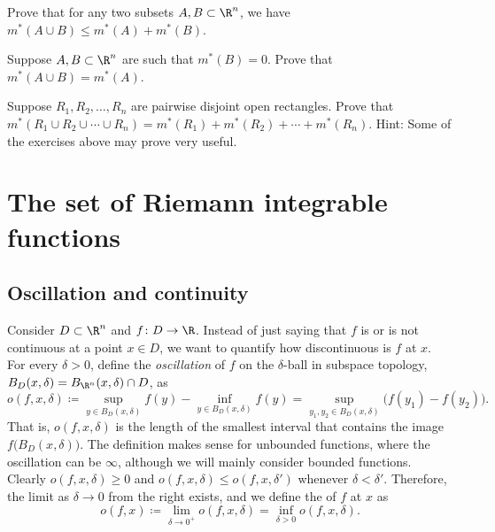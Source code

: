 \begin{exercise}
Prove that for any two subsets $A, B \subset \R^n$, we have
$m^*(A \cup B) \leq m^*(A)+m^*(B)$.
\end{exercise}

\begin{exercise}
Suppose $A, B \subset \R^n$ are such that $m^*(B)=0$.  Prove that
$m^*(A \cup B) = m^*(A)$.
\end{exercise}

\begin{exercise}[Challenging] \label{exercise:outermeasureofsumofrectangles}
Suppose $R_1,R_2,\ldots,R_n$ are pairwise disjoint open rectangles.
Prove that 
$m^*(R_1 \cup R_2 \cup \cdots \cup R_n) = m^*(R_1)+m^*(R_2)+\cdots+m^*(R_n)$.
Hint: Some of the exercises above may prove very useful.
\end{exercise}



\sectionnewpage
\section{The set of Riemann integrable functions }
\label{sec:riemannlebesgue}



\subsection{Oscillation and continuity}

Consider
$D \subset \R^n$ and $f \colon D \to \R$.
Instead of just saying that $f$ is or is not continuous at
a point $x \in D$,
we want to quantify how discontinuous is $f$
at $x$.  For every $\delta > 0$, define the \emph{oscillation} of 
$f$ on the $\delta$-ball in subspace topology,
$B_D(x,\delta) = B_{\R^n}(x,\delta) \cap D$, as
\begin{equation*}
o(f,x,\delta) \coloneqq
{\sup_{y \in B_D(x,\delta)} f(y)}
-
{\inf_{y \in B_D(x,\delta)} f(y)}
= 
\sup_{y_1,y_2 \in B_D(x,\delta)} \bigl(f(y_1)-f(y_2)\bigr) .
\end{equation*}
That is, $o(f,x,\delta)$ is the length of the smallest interval
that contains the image $f\bigl(B_D(x,\delta)\bigr)$.
The definition makes sense for unbounded functions, where the oscillation
can be $\infty$, although we will mainly consider bounded functions.
Clearly $o(f,x,\delta) \geq 0$ and
$o(f,x,\delta) \leq o(f,x,\delta')$ whenever $\delta < \delta'$.
Therefore, the limit as $\delta \to 0$ from the right exists, and
we define the \emph{} of $f$
at $x$ as
\begin{equation*}
o(f,x) \coloneqq
\lim_{\delta \to 0^+}
o(f,x,\delta) =
\inf_{\delta > 0}
o(f,x,\delta) .
\end{equation*}

